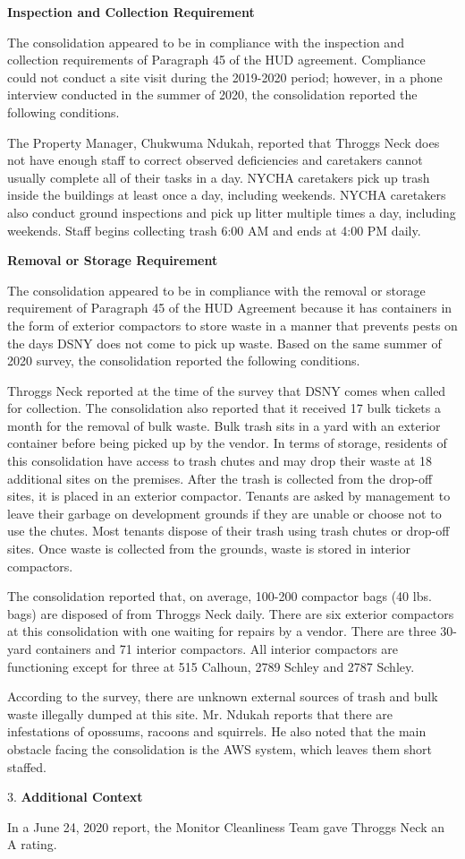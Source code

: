 
\textbf{Inspection and Collection Requirement}

The consolidation appeared to be in compliance with the inspection and collection requirements of Paragraph 45 of the HUD agreement. Compliance could not conduct a site visit during the 2019-2020 period; however, in a phone interview conducted in the summer of 2020, the consolidation reported the following conditions.

The Property Manager, Chukwuma Ndukah, reported that Throggs Neck does not have enough staff to correct observed deficiencies and caretakers cannot usually complete all of their tasks in a day. NYCHA caretakers pick up trash inside the buildings at least once a day, including weekends. NYCHA caretakers also conduct ground inspections and pick up litter multiple times a day, including weekends. Staff begins collecting trash 6:00 AM and ends at 4:00 PM daily.

\textbf{Removal or Storage Requirement}

The consolidation appeared to be in compliance with the  removal or storage requirement of Paragraph  45 of the HUD Agreement because it has containers in the form of exterior compactors to store waste in a manner that prevents pests on the days DSNY does not come to pick up waste. Based on the same summer of  2020 survey, the consolidation reported the following conditions.

Throggs Neck reported at the time of the survey that DSNY comes when called for collection. The consolidation also reported that it received 17 bulk tickets a month for the removal of bulk waste. Bulk trash sits in a yard with an exterior container before being picked up by the vendor. In terms of storage, residents of this consolidation have access to trash chutes and may drop their waste at 18 additional sites on the premises. After the trash is collected from the drop-off sites, it is placed in an exterior compactor. Tenants are asked by management to leave their garbage on development grounds if they are unable or choose not to use the chutes. Most tenants dispose of their trash using trash chutes or drop-off sites. Once waste is collected from the grounds, waste is stored in interior compactors. 

The consolidation reported that, on average, 100-200 compactor bags (40 lbs. bags) are disposed of from Throggs Neck daily. There are six exterior compactors at this consolidation with one waiting for repairs by a vendor. There are three 30-yard containers and 71 interior compactors. All interior compactors are functioning except for three at 515 Calhoun, 2789 Schley and 2787 Schley.

According to the survey, there are unknown external sources of trash and bulk waste illegally dumped at this site. Mr. Ndukah reports that there are infestations of opossums, racoons and squirrels. He also noted that the main obstacle facing the consolidation is the AWS system, which leaves them short staffed.

3. \textbf{Additional Context} 

In a June 24, 2020 report, the Monitor Cleanliness Team gave Throggs Neck an A rating. 